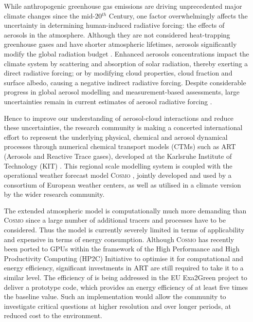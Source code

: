 While anthropogenic greenhouse gas emissions are driving unprecedented
major  climate changes  since  the mid-20$^{th}$  Century, one  factor
overwhelmingly  affects the  uncertainty in  determining human-induced
radiative  forcing:  the  effects   of  aerosols  in  the  atmosphere.
Although they  are not  considered heat-trapping greenhouse  gases and
have shorter atmospheric  lifetimes, aerosols significantly modify the
global   radiation   budget   \cite{IPCC-2013}.    Enhanced   aerosols
concentrations impact the climate  system by scattering and absorption
of solar radiation, thereby exerting a direct radiative forcing; or by
modifying cloud properties, cloud fraction and surface albedo, causing
a negative indirect  radiative forcing.  Despite considerable progress
in  global aerosol  modelling  \cite{Mann-2013} and  measurement-based
assessments,  large  uncertainties  remain  in  current  estimates  of
aerosol  radiative   forcing  \cite{IPCC-2013,  Lee-2013,  Myhre-2013,
Randles-2013, Rosenfeld-2013, Sherwood-2013, Stier-2013}.

Hence to  improve our understanding of  aerosol-cloud interactions and
reduce  these  uncertainties,  the  research  community  is  making  a
concerted international  effort to represent  the underlying physical,
chemical  and aerosol dynamical  processes through  numerical chemical
transport  models (CTMs)  such  as ART  (Aerosols  and Reactive  Trace
gases),   developed   at  the   Karlsruhe   Institute  of   Technology
(KIT)  \cite{Vogel-2009,  Bangert-2011,  Knote-2013}.   This  regional
scale  modelling  system  is  coupled  with  the  operational  weather
forecast  model \textsc{Cosmo} \cite{Baldauf-2011},  jointly developed
and  used by  a consortium  of European  weather centers,  as  well as
utilised in a climate version by the wider research community.

The extended  atmospheric model \cosmoart  is com\-put\-ationally much
more demanding than \textsc{Cosmo}  since a large number of additional
tracers  and processes  have  to  be considered.   Thus  the model  is
currently severely limited in  terms of applicability and expensive in
terms  of energy  consumption.  Although  \textsc{Cosmo}  has recently
been  ported  to  GPUs  \cite{Gysi-2014, Lapillonne-2014}  within  the
framework  of the  High  Performance and  High Productivity  Computing
(HP2C)  Initiative \cite{HP2C}  to optimise  it for  computational and
energy efficiency,  significant investments in ART  are still required
to take it  to a similar level.  The efficiency  of \cosmoart is being
addressed in  the EU Exa2Green  project \cite{EXA2GREEN} to  deliver a
prototype code, which  provides an energy efficiency of  at least five
times  the baseline  value.  Such  an implementation  would  allow the
community to  investigate critical questions at  higher resolution and
over longer periods, at reduced cost to the environment.

